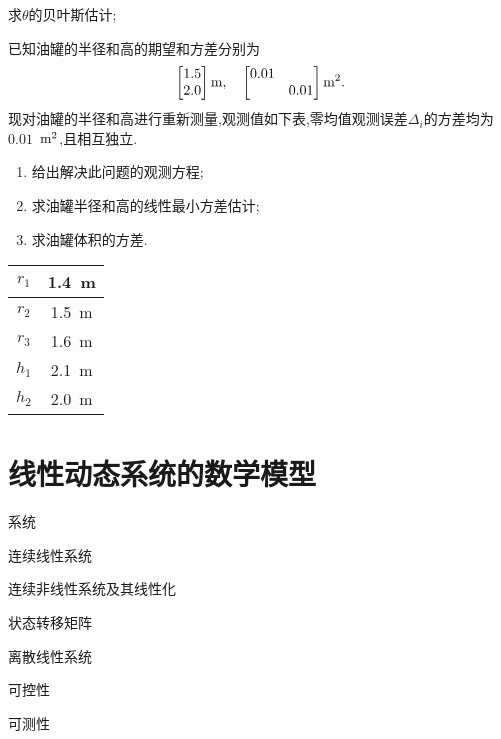 \documentclass[cn,10pt,citestyle=gb7714-2015,bibstyle=gb7714-2015]{elegantbook}
\begin{document}
\begin{problemset}
\[  \]
  求$\theta$的贝叶斯估计;
  \item 已知油罐的半径和高的期望和方差分别为
  \[
      \begin{bmatrix}
        1.5\\
        2.0
      \end{bmatrix}\textup{m},\quad
      \begin{bmatrix}
        0.01& \\
         &0.01
      \end{bmatrix}\textup{m}^2.
  \]
  现对油罐的半径和高进行重新测量,观测值如下表,零均值观测误差$\varDelta_i$的方差均为$0.01$\ $\textup{m}^2$,且相互独立.
  \begin{enumerate}
    \item 给出解决此问题的观测方程;
    \item 求油罐半径和高的线性最小方差估计;
    \item 求油罐体积的方差.
  \end{enumerate}
    \begin{table}[H]
    \begin{center}
    \begin{tabular}{|c|c|}
    \hline
    $r_1$ & 1.4\ m \\ \hline
    $r_2$ & 1.5\ m \\ \hline
    $r_3$ & 1.6\ m \\ \hline
    $h_1$ & 2.1\ m \\ \hline
    $h_2$ & 2.0\ m \\ \hline
    \end{tabular}
    \end{center}
    \end{table}
\end{problemset}
\chapter{线性动态系统的数学模型}\label{ch:3}
\begin{introduction}
  \item 系统
  \item 连续线性系统
  \item 连续非线性系统及其线性化
  \item 状态转移矩阵
  \item 离散线性系统
  \item 可控性
  \item 可测性
\end{introduction}
\end{document}
